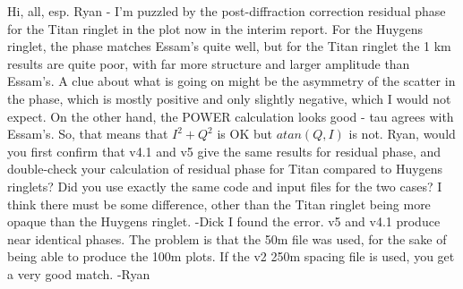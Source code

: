 \documentclass[crop=false,class=article,oneside]{standalone}
\begin{document}
    
Hi, all, esp. Ryan - I'm puzzled by the post-diffraction correction residual phase for the Titan ringlet in the plot now in the interim report. For the Huygens ringlet, the phase matches Essam's quite well, but for the Titan ringlet the 1 km results are quite poor, with far more structure and larger amplitude than Essam's. A clue about what is going on might be the asymmetry of the scatter in the phase, which is mostly positive and only slightly negative, which I would not expect. On the other hand, the POWER calculation looks good - tau agrees with Essam's. So, that means that $I^{2}+Q^{2}$ is OK but $atan(Q,I)$ is not. Ryan, would you first confirm that v4.1 and v5 give the same results for residual phase, and double-check your calculation of residual phase for Titan compared to Huygens ringlets? Did you use exactly the same code and input files for the two cases? I think there must be some difference, other than the Titan ringlet being more opaque than the Huygens ringlet. -Dick
I found the error. v5 and v4.1 produce near identical phases. The problem is that the 50m file was used, for the sake of being able to produce the 100m plots. If the v2 250m spacing file is used, you get a very good match. -Ryan
\end{document}
